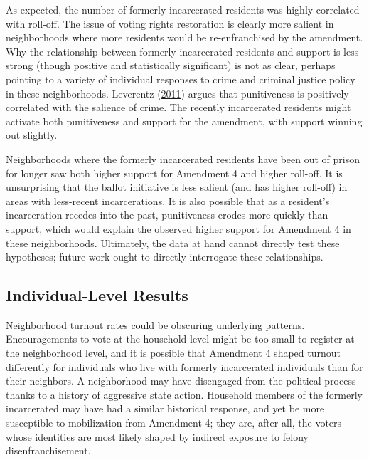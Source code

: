 \documentclass[
  12pt,
]{article}
\begin{document}
As expected, the number of formerly incarcerated residents was highly correlated with roll-off. The issue of voting rights restoration is clearly more salient in neighborhoods where more residents would be re-enfranchised by the amendment. Why the relationship between formerly incarcerated residents and support is less strong (though positive and statistically significant) is not as clear, perhaps pointing to a variety of individual responses to crime and criminal justice policy in these neighborhoods. Leverentz (\protect\hyperlink{ref-Leverentz2011}{2011}) argues that punitiveness is positively correlated with the salience of crime. The recently incarcerated residents might activate both punitiveness and support for the amendment, with support winning out slightly.

Neighborhoods where the formerly incarcerated residents have been out of prison for longer saw both higher support for Amendment 4 and higher roll-off. It is unsurprising that the ballot initiative is less salient (and has higher roll-off) in areas with less-recent incarcerations. It is also possible that as a resident's incarceration recedes into the past, punitiveness erodes more quickly than support, which would explain the observed higher support for Amendment 4 in these neighborhoods. Ultimately, the data at hand cannot directly test these hypotheses; future work ought to directly interrogate these relationships.

\hypertarget{individual-level-results}{%
\subsection*{Individual-Level Results}\label{individual-level-results}}

Neighborhood turnout rates could be obscuring underlying patterns. Encouragements to vote at the household level might be too small to register at the neighborhood level, and it is possible that Amendment 4 shaped turnout differently for individuals who live with formerly incarcerated individuals than for their neighbors. A neighborhood may have disengaged from the political process thanks to a history of aggressive state action. Household members of the formerly incarcerated may have had a similar historical response, and yet be more susceptible to mobilization from Amendment 4; they are, after all, the voters whose identities are most likely shaped by indirect exposure to felony disenfranchisement.
\end{document}
